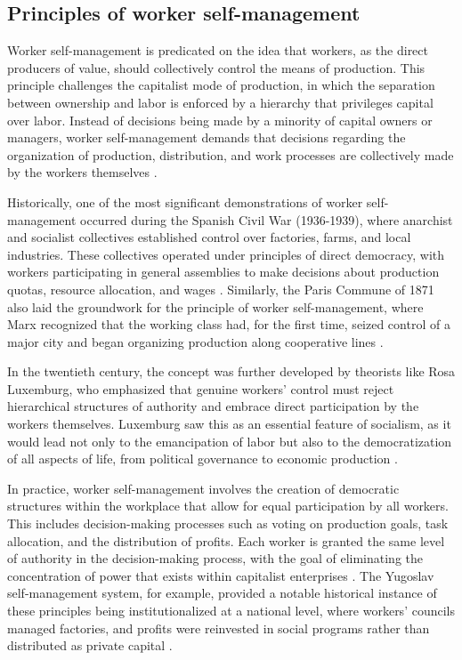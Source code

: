 \begin{refsection}
\subsection{Principles of worker self-management}

Worker self-management is predicated on the idea that workers, as the direct producers of value, should collectively control the means of production. This principle challenges the capitalist mode of production, in which the separation between ownership and labor is enforced by a hierarchy that privileges capital over labor. Instead of decisions being made by a minority of capital owners or managers, worker self-management demands that decisions regarding the organization of production, distribution, and work processes are collectively made by the workers themselves \cite[pp.~17-23]{pateman1970}. 

Historically, one of the most significant demonstrations of worker self-management occurred during the Spanish Civil War (1936-1939), where anarchist and socialist collectives established control over factories, farms, and local industries. These collectives operated under principles of direct democracy, with workers participating in general assemblies to make decisions about production quotas, resource allocation, and wages \cite[pp.~45-49]{bookchin1994}. Similarly, the Paris Commune of 1871 also laid the groundwork for the principle of worker self-management, where Marx recognized that the working class had, for the first time, seized control of a major city and began organizing production along cooperative lines \cite[pp.~63-67]{marx1977}. 

In the twentieth century, the concept was further developed by theorists like Rosa Luxemburg, who emphasized that genuine workers' control must reject hierarchical structures of authority and embrace direct participation by the workers themselves. Luxemburg saw this as an essential feature of socialism, as it would lead not only to the emancipation of labor but also to the democratization of all aspects of life, from political governance to economic production \cite[pp.~98-102]{luxemburg2004}. 

In practice, worker self-management involves the creation of democratic structures within the workplace that allow for equal participation by all workers. This includes decision-making processes such as voting on production goals, task allocation, and the distribution of profits. Each worker is granted the same level of authority in the decision-making process, with the goal of eliminating the concentration of power that exists within capitalist enterprises \cite[pp.~45-50]{vanek1977}. The Yugoslav self-management system, for example, provided a notable historical instance of these principles being institutionalized at a national level, where workers’ councils managed factories, and profits were reinvested in social programs rather than distributed as private capital \cite[pp.~132-139]{woodward1995}.


\end{refsection}
